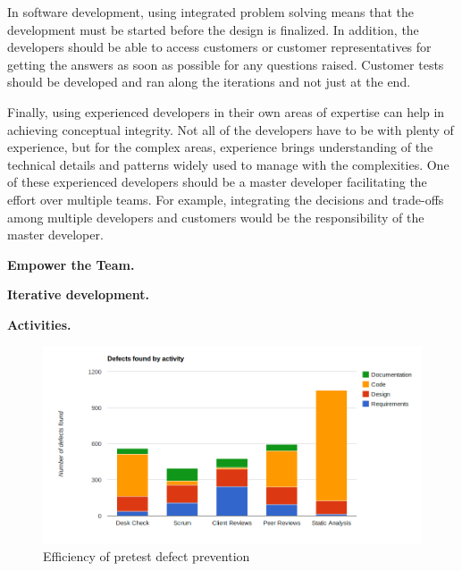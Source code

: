 In software development, using integrated problem solving means that the development must be started before the design is finalized. In addition, the developers should be able to access customers or customer representatives for getting the answers as soon as possible for any questions raised. Customer tests should be developed and ran along the iterations and not just at the end.

Finally, using experienced developers in their own areas of expertise can help in achieving conceptual integrity. Not all of the developers have to be with plenty of experience, but for the complex areas, experience brings understanding of the technical details and patterns widely used to manage with the complexities. One of these experienced developers should be a master developer facilitating the effort over multiple teams. For example, integrating the decisions and trade-offs among multiple developers and customers would be the responsibility of the master developer.






\textbf{Empower the Team.}




\textbf{Iterative development.}

\textbf{Activities.}

\begin{figure}[t]
\begin{center}
\includegraphics[width=1.0\textwidth]{image/pretest-efficiency.png}
\end{center}
\caption{Efficiency of pretest defect prevention}
\label{fig:pretest-efficiency}
\end{figure}

